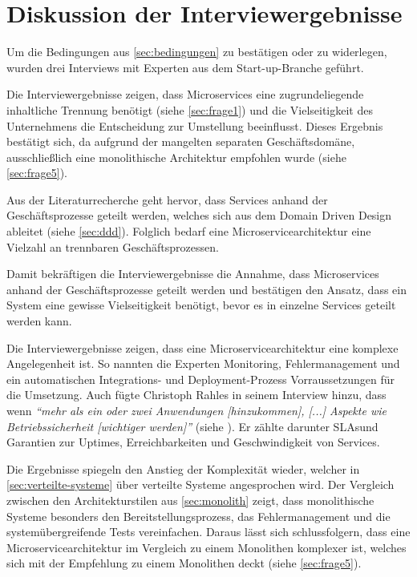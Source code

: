 \section{Diskussion der Interviewergebnisse}
\label{sec:auswertung}

Um die Bedingungen aus \cref{sec:bedingungen} zu bestätigen oder zu widerlegen, wurden drei Interviews mit Experten aus dem Start-up-Branche geführt.

Die Interviewergebnisse zeigen, dass Microservices eine zugrundeliegende inhaltliche Trennung benötigt (siehe \cref{sec:frage1}) und die Vielseitigkeit des Unternehmens die Entscheidung zur Umstellung beeinflusst. Dieses Ergebnis bestätigt sich, da aufgrund der mangelten separaten Geschäftsdomäne, ausschließlich eine monolithische Architektur empfohlen wurde (siehe \cref{sec:frage5}).

Aus der Literaturrecherche geht hervor, dass Services anhand der Geschäftsprozesse geteilt werden, welches sich aus dem Domain Driven Design ableitet (siehe \cref{sec:ddd}). Folglich bedarf eine Microservicearchitektur eine Vielzahl an trennbaren Geschäftsprozessen.

Damit bekräftigen die Interviewergebnisse die Annahme, dass Microservices anhand der Geschäftsprozesse geteilt werden und bestätigen den Ansatz, dass ein System eine gewisse Vielseitigkeit benötigt, bevor es in einzelne Services geteilt werden kann.

Die Interviewergebnisse zeigen, dass eine Microservicearchitektur eine komplexe Angelegenheit ist. So nannten die Experten Monitoring, Fehlermanagement und ein automatischen Integrations- und Deployment-Prozess 
Vorraussetzungen für die Umsetzung. Auch fügte Christoph Rahles in seinem Interview hinzu, dass wenn \textit{\enquote{mehr als ein oder zwei Anwendungen [hinzukommen], [...] Aspekte wie Betriebssicherheit [wichtiger werden]}} (siehe ). Er zählte darunter SLAs\footnotemark und Garantien zur Uptimes, Erreichbarkeiten und Geschwindigkeit von Services.

Die Ergebnisse spiegeln den Anstieg der Komplexität wieder, welcher in \cref{sec:verteilte-systeme} über verteilte Systeme angesprochen wird. Der Vergleich zwischen den Architekturstilen aus \cref{sec:monolith} zeigt, dass monolithische Systeme besonders den Bereitstellungsprozess, das Fehlermanagement und die systemübergreifende Tests vereinfachen. Daraus lässt sich schlussfolgern, dass eine Microservicearchitektur im Vergleich zu einem Monolithen komplexer ist, welches sich mit der Empfehlung zu einem Monolithen deckt (siehe \cref{sec:frage5}).

